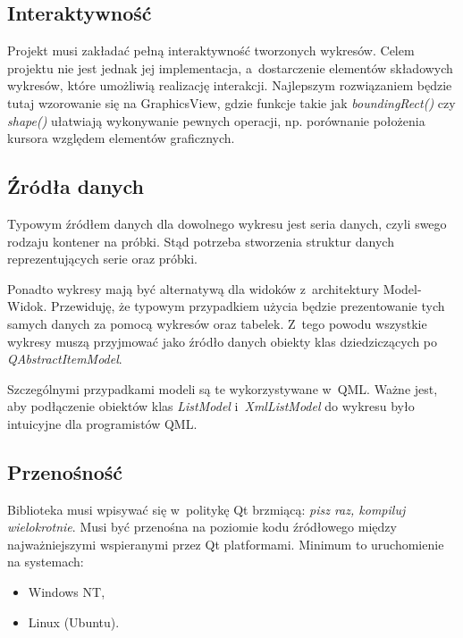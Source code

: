 \subsection{Interaktywność}
Projekt musi zakładać pełną interaktywność tworzonych wykresów. Celem projektu nie jest jednak jej implementacja, a~dostarczenie elementów składowych wykresów, które umożliwią realizację interakcji. Najlepszym rozwiązaniem będzie tutaj wzorowanie się na GraphicsView, gdzie funkcje takie jak \textit{boundingRect()} czy \textit{shape()} ułatwiają wykonywanie pewnych operacji, np. porównanie położenia kursora względem elementów graficznych.

\subsection{Źródła danych}
Typowym źródłem danych dla dowolnego wykresu jest seria danych, czyli swego rodzaju kontener na próbki.
Stąd potrzeba stworzenia struktur danych reprezentujących serie oraz próbki.

Ponadto wykresy mają być alternatywą dla widoków z~architektury Model-Widok. Przewiduję, że typowym przypadkiem użycia będzie prezentowanie tych samych danych za pomocą wykresów oraz tabelek. Z~tego powodu wszystkie wykresy muszą przyjmować jako źródło danych obiekty klas dziedziczących po \textit{QAbstractItemModel}.

Szczególnymi przypadkami modeli są te wykorzystywane w~QML. Ważne jest, aby podłączenie obiektów klas \textit{ListModel} i~\textit{XmlListModel} do wykresu było intuicyjne dla programistów QML.


\subsection{Przenośność}
Biblioteka musi wpisywać się w~politykę Qt brzmiącą: \textit{pisz raz, kompiluj wielokrotnie}. Musi być przenośna na poziomie kodu źródłowego między najważniejszymi wspieranymi przez Qt platformami.
Minimum to uruchomienie na systemach:
\begin{itemize}
\item{Windows NT,}
\item{Linux (Ubuntu).}
\end{itemize}



